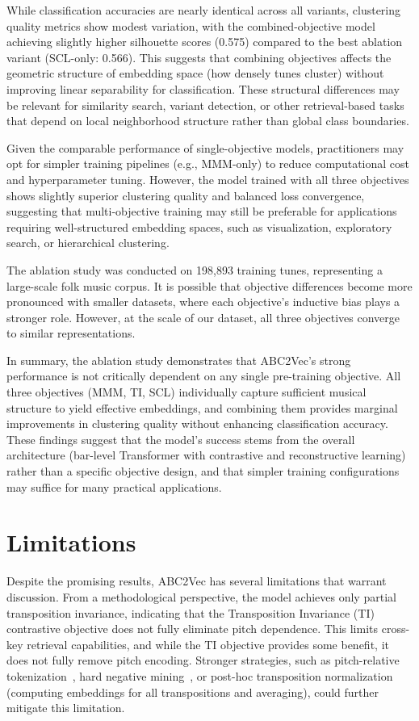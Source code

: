 \documentclass[]{interact}
\theoremstyle{plain}
\theoremstyle{definition}
\theoremstyle{remark}
\begin{document}
While classification accuracies are nearly identical across all variants, clustering quality metrics show modest variation, with the combined-objective model achieving slightly higher silhouette scores (0.575) compared to the best ablation variant (SCL-only: 0.566). This suggests that combining objectives affects the geometric structure of embedding space (how densely tunes cluster) without improving linear separability for classification. These structural differences may be relevant for similarity search, variant detection, or other retrieval-based tasks that depend on local neighborhood structure rather than global class boundaries.

Given the comparable performance of single-objective models, practitioners may opt for simpler training pipelines (e.g., MMM-only) to reduce computational cost and hyperparameter tuning. However, the model trained with all three objectives shows slightly superior clustering quality and balanced loss convergence, suggesting that multi-objective training may still be preferable for applications requiring well-structured embedding spaces, such as visualization, exploratory search, or hierarchical clustering.

The ablation study was conducted on 198,893 training tunes, representing a large-scale folk music corpus. It is possible that objective differences become more pronounced with smaller datasets, where each objective's inductive bias plays a stronger role. However, at the scale of our dataset, all three objectives converge to similar representations.

In summary, the ablation study demonstrates that ABC2Vec's strong performance is not critically dependent on any single pre-training objective. All three objectives (MMM, TI, SCL) individually capture sufficient musical structure to yield effective embeddings, and combining them provides marginal improvements in clustering quality without enhancing classification accuracy. These findings suggest that the model's success stems from the overall architecture (bar-level Transformer with contrastive and reconstructive learning) rather than a specific objective design, and that simpler training configurations may suffice for many practical applications.


\section{Limitations}\label{sec:limitations}

Despite the promising results, ABC2Vec has several limitations that warrant discussion. From a methodological perspective, the model achieves only partial transposition invariance, indicating that the Transposition Invariance (TI) contrastive objective does not fully eliminate pitch dependence. This limits cross-key retrieval capabilities, and while the TI objective provides some benefit, it does not fully remove pitch encoding. Stronger strategies, such as pitch-relative tokenization~\cite{likhomanenko2021cape}, hard negative mining~\cite{gajic2021fast}, or post-hoc transposition normalization (computing embeddings for all transpositions and averaging), could further mitigate this limitation.
\end{document}
